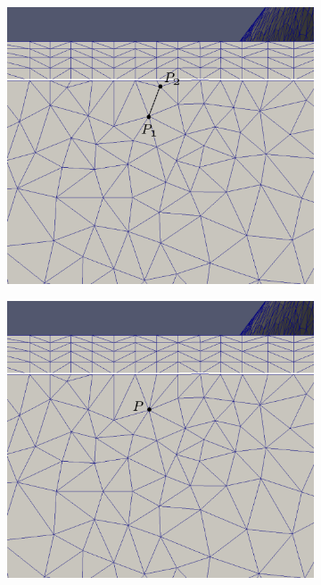 \begin{figure}[hbt!]
	\centering
	\begin{subfigure}{.5\textwidth}
		\centering
		\includegraphics[width=.9\linewidth, trim={0 5cm 0  0}, clip]{img/m2/interior-vert-collapse/cc1.eps}
		\caption{}
		\label{cc1}
	\end{subfigure}%
	\begin{subfigure}{.5\textwidth}
		\centering
		\includegraphics[width=.9\linewidth, trim={0 5cm 0  0}, clip]{img/m2/interior-vert-collapse/cc2.eps}
		\caption{}
		\label{cc2}
	\end{subfigure}

\end{figure}
